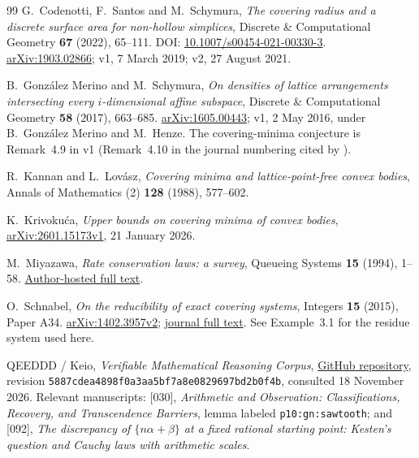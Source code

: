 \documentclass[11pt,a4paper]{article}
\theoremstyle{definition}\newtheorem{definition}[theorem]{Definition}
\theoremstyle{remark}\newtheorem{remark}[theorem]{Remark}
\begin{document}
\begin{thebibliography}{99}
G.~Codenotti, F.~Santos and M.~Schymura,
\emph{The covering radius and a discrete surface area for non-hollow
simplices}, Discrete \& Computational Geometry \textbf{67} (2022),
65--111. DOI: \href{https://doi.org/10.1007/s00454-021-00330-3}
{10.1007/s00454-021-00330-3}.
\href{https://arxiv.org/abs/1903.02866}{arXiv:1903.02866};
v1, 7 March 2019; v2, 27 August 2021.

B.~Gonz\'alez Merino and M.~Schymura,
\emph{On densities of lattice arrangements intersecting every
$i$-dimensional affine subspace}, Discrete \& Computational Geometry
\textbf{58} (2017), 663--685.
\href{https://arxiv.org/abs/1605.00443}{arXiv:1605.00443};
v1, 2 May 2016, under B.~Gonz\'alez Merino and M.~Henze.
The covering-minima conjecture is Remark~4.9 in v1
(Remark~4.10 in the journal numbering cited by \cite{CSS}).

R.~Kannan and L.~Lov\'asz,
\emph{Covering minima and lattice-point-free convex bodies},
Annals of Mathematics (2) \textbf{128} (1988), 577--602.

K.~Krivoku\'ca,
\emph{Upper bounds on covering minima of convex bodies},
\href{https://arxiv.org/abs/2601.15173}{arXiv:2601.15173v1},
21 January 2026.

M.~Miyazawa,
\emph{Rate conservation laws: a survey},
Queueing Systems \textbf{15} (1994), 1--58.
\href{https://www.rs.tus.ac.jp/miyazawa/pdf-file/Miya1994-QS-RCL.pdf}
{Author-hosted full text}.

O.~Schnabel,
\emph{On the reducibility of exact covering systems},
Integers \textbf{15} (2015), Paper A34.
\href{https://arxiv.org/abs/1402.3957}{arXiv:1402.3957v2};
\href{https://math.colgate.edu/~integers/p34/p34.pdf}{journal full text}.
See Example~3.1 for the residue system used here.

QEEDDD / Keio,
\emph{Verifiable Mathematical Reasoning Corpus},
\href{https://github.com/QEEDDD/Verifiable-Mathematical-Reasoning-Corpus}
{GitHub repository}, revision
\texttt{5887cdea4898f0a3aa5bf7a8e0829697bd2b0f4b},
consulted 18 November 2026.
Relevant manuscripts: [030], \emph{Arithmetic and Observation:
Classifications, Recovery, and Transcendence Barriers}, lemma labeled
\texttt{p10:gn:sawtooth}; and [092],
\emph{The discrepancy of $\{n\alpha+\beta\}$ at a fixed rational
starting point: Kesten's question and Cauchy laws with arithmetic scales}.
\end{thebibliography}
\end{document}
